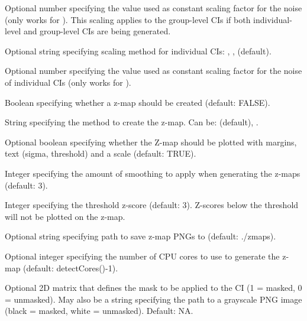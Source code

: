 \documentclass[letterpaper]{book}
\begin{document}
\begin{Arguments}
\begin{ldescription}
\item[\code{scaling\_constant}] Optional number specifying the value used as constant scaling factor for the noise (only works for ). This scaling applies to the group-level CIs if both individual-level and group-level CIs are being generated.

\item[\code{individual\_scaling}] Optional string specifying scaling method for individual CIs: , ,  (default).

\item[\code{individual\_scaling\_constant}] Optional number specifying the value used as constant scaling factor for the noise of individual CIs (only works for ).

\item[\code{zmap}] Boolean specifying whether a z-map should be created (default: FALSE).

\item[\code{zmapmethod}] String specifying the method to create the z-map. Can be:  (default), .

\item[\code{zmapdecoration}] Optional boolean specifying whether the Z-map should be plotted with margins, text (sigma, threshold) and a scale (default: TRUE).

\item[\code{sigma}] Integer specifying the amount of smoothing to apply when generating the z-maps (default: 3).

\item[\code{threshold}] Integer specifying the threshold z-score (default: 3). Z-scores below the threshold will not be plotted on the z-map.

\item[\code{zmaptargetpath}] Optional string specifying path to save z-map PNGs to (default: ./zmaps).

\item[\code{n\_cores}] Optional integer specifying the number of CPU cores to use to generate the z-map (default: detectCores()-1).

\item[\code{mask}] Optional 2D matrix that defines the mask to be applied to the CI (1 = masked, 0 = unmasked). May also be a string specifying the path to a grayscale PNG image (black = masked, white = unmasked). Default: NA.
\end{ldescription}
\end{Arguments}
\end{document}
